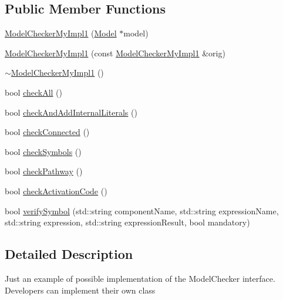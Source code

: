 \subsection*{Public Member Functions}
\begin{DoxyCompactItemize}
\item 
\hyperlink{class_model_checker_my_impl1_a1e20144586ebb7290ee270ed4f61d322}{Model\-Checker\-My\-Impl1} (\hyperlink{class_model}{Model} $\ast$model)
\item 
\hyperlink{class_model_checker_my_impl1_ad66b5eebec60d37add1629f96e9488ce}{Model\-Checker\-My\-Impl1} (const \hyperlink{class_model_checker_my_impl1}{Model\-Checker\-My\-Impl1} \&orig)
\item 
\hyperlink{class_model_checker_my_impl1_acd10fffc264cf286a304fce9538a7189}{$\sim$\-Model\-Checker\-My\-Impl1} ()
\item 
bool \hyperlink{class_model_checker_my_impl1_adbed52d807b882ee75f10372b8b379e1}{check\-All} ()
\item 
bool \hyperlink{class_model_checker_my_impl1_aa6dc0de6220d37a63a3037a090335d61}{check\-And\-Add\-Internal\-Literals} ()
\item 
bool \hyperlink{class_model_checker_my_impl1_a2a7abd0bdf163415ec9aa92741ea5d03}{check\-Connected} ()
\item 
bool \hyperlink{class_model_checker_my_impl1_a37856818d6597563f079401bf6652cbb}{check\-Symbols} ()
\item 
bool \hyperlink{class_model_checker_my_impl1_afd162b06a60ec5bf1e3a4f3340728ac3}{check\-Pathway} ()
\item 
bool \hyperlink{class_model_checker_my_impl1_a1139d516075b03d96eaa0db01e108c2c}{check\-Activation\-Code} ()
\item 
bool \hyperlink{class_model_checker_my_impl1_af92c7b51b8207c1718b496df104b1f11}{verify\-Symbol} (std\-::string component\-Name, std\-::string expression\-Name, std\-::string expression, std\-::string expression\-Result, bool mandatory)
\end{DoxyCompactItemize}


\subsection{Detailed Description}
Just an example of possible implementation of the Model\-Checker interface. Developers can implement their own class 

